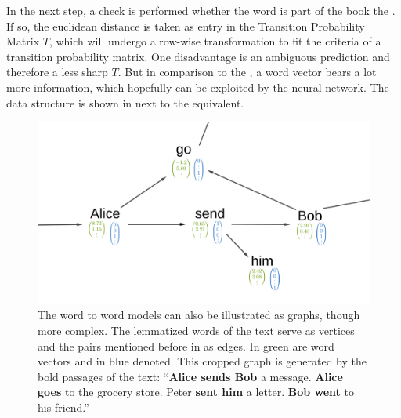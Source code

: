 In the next step, a check is performed whether the word is part of the book \ie the \cognitiveroom{}. If so, the euclidean distance is taken as entry in the Transition Probability Matrix $ T $, which will undergo a row-wise transformation to fit the criteria of a transition probability matrix. One disadvantage is an ambiguous prediction and therefore a less sharp $ T $. But in comparison to the \onehot{}, a word vector bears a lot more information, which hopefully can be exploited by the neural network. The data structure is shown in \figref{\ref{fig: text model graph ohe w2v}} next to the \onehot{} equivalent.

\begin{figure}
    \centering
        \includegraphics[width=\linewidth]{Bilder/Graphen/w2w_ohe_w2v.png}
    \caption{The word to word models can also be illustrated as graphs, though more complex. The lemmatized words of the text serve as vertices and the pairs mentioned before in  as edges. In green are word vectors and in blue  denoted. This cropped graph is generated by the bold passages of the text: ``\textbf{Alice sends Bob} a message. \textbf{Alice goes} to the grocery store. Peter \textbf{sent him} a letter. \textbf{Bob went} to his friend.''}
    \label{fig: text model graph ohe w2v}
\end{figure}


